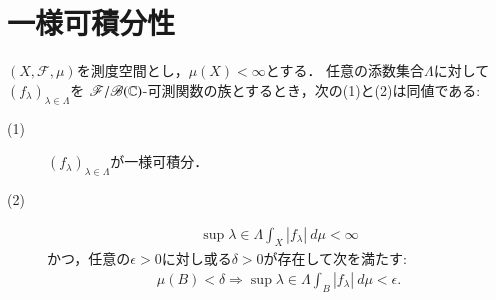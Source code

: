 \section{一様可積分性}
	\begin{screen}
	\begin{thm}[一様可積分性の同値条件]\label{thm:appendix_uniform_integrability_equivalence}
		$(X,\mathscr{F},\mu)$を測度空間とし，$\mu(X)<\infty$とする．
		任意の添数集合$\Lambda$に対して$(f_\lambda)_{\lambda \in \Lambda}$を
		$\mathscr{F}/\mathscr{B}(\mathbb{C})$-可測関数の族とするとき，次の(1)と(2)は同値である:
		\begin{description}
			\item[(1)] $(f_\lambda)_{\lambda \in \Lambda}$が一様可積分．
			\item[(2)] 
				\begin{align}
					\sup{\lambda \in \Lambda}\int_X|f_\lambda|\ d\mu < \infty
					\label{eq:thm_appendix_uniform_integrability_equivalence_1}
				\end{align}
				かつ，任意の$\epsilon > 0$に対し或る$\delta > 0$が存在して次を満たす:
				\begin{align}
					\mu(B) < \delta
					\Rightarrow \sup{\lambda \in \Lambda}\int_B |f_\lambda|\ d\mu < \epsilon.
					\label{eq:thm_appendix_uniform_integrability_equivalence_2}
				\end{align}
		\end{description}
	\end{thm}
	\end{screen}
	
